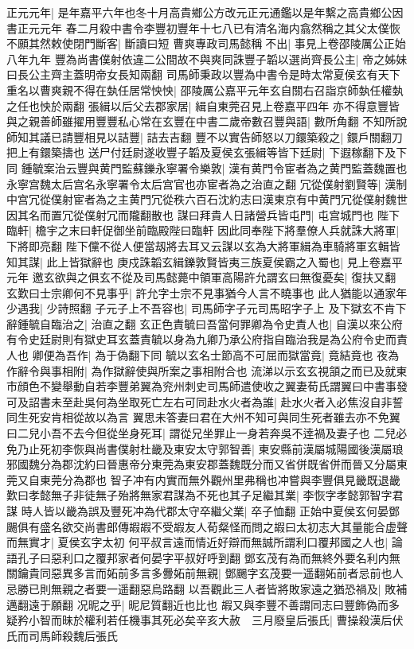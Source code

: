 正元元年|{
	是年嘉平六年也冬十月高貴鄉公方改元正元通鑑以是年繫之高貴鄉公因書正元元年}
春二月殺中書令李豐初豐年十七八已有清名海内翕然稱之其父太僕恢不願其然敕使閉門斷客|{
	斷讀曰短}
曹爽專政司馬懿稱不出|{
	事見上卷邵陵厲公正始八年九年}
豐為尚書僕射依違二公間故不與爽同誅豐子韜以選尚齊長公主|{
	帝之姊妹曰長公主齊主蓋明帝女長知兩翻}
司馬師秉政以豐為中書令是時太常夏侯玄有天下重名以曹爽親不得在埶任居常怏怏|{
	邵陵厲公嘉平元年玄自關右召詣京師埶任權埶之任也怏於兩翻}
張緝以后父去郡家居|{
	緝自東莞召見上卷嘉平四年}
亦不得意豐皆與之親善師雖擢用豐豐私心常在玄豐在中書二歲帝數召豐與語|{
	數所角翻}
不知所說師知其議已請豐相見以詰豐|{
	詰去吉翻}
豐不以實告師怒以刀鐶築殺之|{
	鐶戶關翻刀把上有鐶築擣也}
送尸付廷尉遂收豐子韜及夏侯玄張緝等皆下廷尉|{
	下遐稼翻下及下同}
鍾毓案治云豐與黄門監蘇鑠永寧署令樂敦|{
	漢有黄門令宦者為之黄門監蓋魏置也永寧宫魏太后宫名永寧署令太后宫官也亦宦者為之治直之翻}
冗從僕射劉賢等|{
	漢制中宫冗從僕射宦者為之主黄門冗從秩六百石沈約志曰漢東京有中黄門冗從僕射魏世因其名而置冗從僕射冗而隴翻散也}
謀曰拜貴人日諸營兵皆屯門|{
	屯宫城門也}
陛下臨軒|{
	檐宇之末曰軒促御坐前臨殿陛曰臨軒}
因此同奉陛下將羣僚人兵就誅大將軍|{
	下將即亮翻}
陛下儻不從人便當刼將去耳又云謀以玄為大將軍緝為車騎將軍玄輯皆知其謀|{
	此上皆獄辭也}
庚戍誅韜玄緝鑠敦賢皆夷三族夏侯霸之入蜀也|{
	見上卷嘉平元年}
邀玄欲與之俱玄不從及司馬懿薨中領軍高陽許允謂玄曰無復憂矣|{
	復扶又翻}
玄歎曰士宗卿何不見事乎|{
	許允字士宗不見事猶今人言不曉事也}
此人猶能以通家年少遇我|{
	少詩照翻}
子元子上不吾容也|{
	司馬師字子元司馬昭字子上}
及下獄玄不肯下辭鍾毓自臨治之|{
	治直之翻}
玄正色責毓曰吾當何罪卿為令史責人也|{
	自漢以來公府有令史廷尉則有獄史耳玄蓋責毓以身為九卿乃承公府指自臨治我是為公府令史而責人也}
卿便為吾作|{
	為于偽翻下同}
毓以玄名士節高不可屈而獄當竟|{
	竟結竟也}
夜為作辭令與事相附|{
	為作獄辭使與所案之事相附合也}
流涕以示玄玄視頷之而已及就東市顔色不變舉動自若李豐弟翼為兖州刺史司馬師遣使收之翼妻荀氏謂翼曰中書事發可及詔書未至赴吳何為坐取死亡左右可同赴水火者為誰|{
	赴水火者入必焦沒自非誓同生死安肯相從故以為言}
翼思未答妻曰君在大州不知可與同生死者雖去亦不免翼曰二兒小吾不去今但從坐身死耳|{
	謂從兄坐罪止一身若奔吳不逹禍及妻子也}
二兒必免乃止死初李恢與尚書僕射杜畿及東安太守郭智善|{
	東安縣前漢屬城陽國後漢屬琅邪國魏分為郡沈約曰晉惠帝分東莞為東安郡蓋魏既分而又省併既省併而晉又分屬東莞又自東莞分為郡也}
智子冲有内實而無外觀州里弗稱也冲嘗與李豐俱見畿既退畿歎曰孝懿無子非徒無子殆將無家君謀為不死也其子足繼其業|{
	李恢字孝懿郭智字君謀}
時人皆以畿為誤及豐死冲為代郡太守卒繼父業|{
	卒子恤翻}
正始中夏侯玄何晏鄧颺俱有盛名欲交尚書郎傳嘏嘏不受嘏友人荀粲怪而問之嘏曰太初志大其量能合虚聲而無實才|{
	夏侯玄字太初}
何平叔言遠而情近好辯而無誠所謂利口覆邦國之人也|{
	論語孔子曰惡利口之覆邦家者何晏字平叔好呼到翻}
鄧玄茂有為而無終外要名利内無關鑰貴同惡異多言而妬前多言多釁妬前無親|{
	鄧颺字玄茂要一遥翻妬前者忌前也人忌勝已則無親之者要一遥翻惡烏路翻}
以吾觀此三人者皆將敗家遠之猶恐禍及|{
	敗補邁翻遠于願翻}
况昵之乎|{
	昵尼質翻近也比也}
嘏又與李豐不善謂同志曰豐飾偽而多疑矜小智而昧於權利若任機事其死必矣辛亥大赦　三月廢皇后張氏|{
	曹操殺漢后伏氏而司馬師殺魏后張氏}


